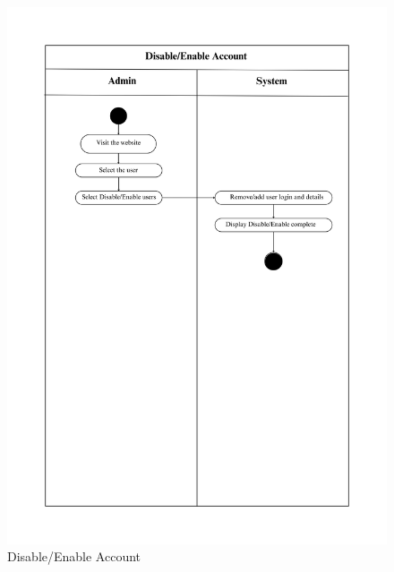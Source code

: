\begin{figure}[h!]
    \centering
    \includegraphics[width=1\linewidth]{Images/Activity Diagrams/4 Disable_Enable Account.png}
    \caption{Disable/Enable Account}
\end{figure}

